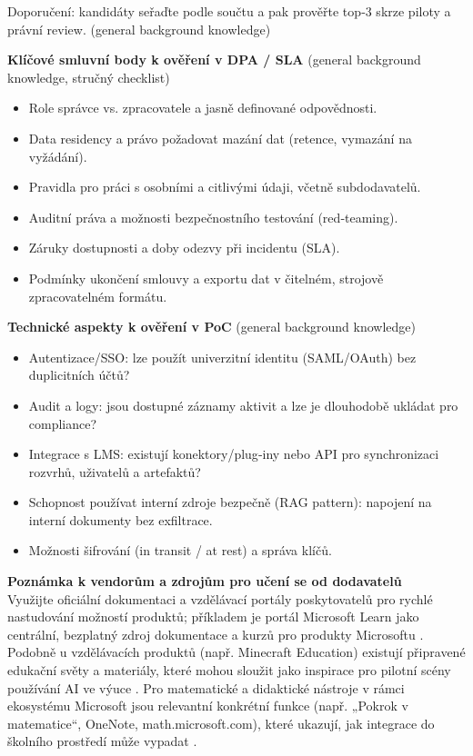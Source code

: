 \documentclass{report}%
\begin{document}
\noindent Doporučení: kandidáty seřaďte podle součtu a pak prověřte top‑3 skrze piloty a právní review. (general background knowledge)

\bigskip

\textbf{Klíčové smluvní body k ověření v DPA / SLA} (general background knowledge, stručný checklist)
\begin{itemize}
  \item Role správce vs. zpracovatele a jasně definované odpovědnosti.
  \item Data residency a právo požadovat mazání dat (retence, vymazání na vyžádání).
  \item Pravidla pro práci s osobními a citlivými údaji, včetně subdodavatelů.
  \item Auditní práva a možnosti bezpečnostního testování (red‑teaming).
  \item Záruky dostupnosti a doby odezvy při incidentu (SLA).
  \item Podmínky ukončení smlouvy a exportu dat v čitelném, strojově zpracovatelném formátu.
\end{itemize}

\bigskip

\textbf{Technické aspekty k ověření v PoC} (general background knowledge)
\begin{itemize}
  \item Autentizace/SSO: lze použít univerzitní identitu (SAML/OAuth) bez duplicitních účtů?
  \item Audit a logy: jsou dostupné záznamy aktivit a lze je dlouhodobě ukládat pro compliance?
  \item Integrace s LMS: existují konektory/plug‑iny nebo API pro synchronizaci rozvrhů, uživatelů a artefaktů?
  \item Schopnost používat interní zdroje bezpečně (RAG pattern): napojení na interní dokumenty bez exfiltrace.
  \item Možnosti šifrování (in transit / at rest) a správa klíčů.
\end{itemize}

\bigskip

\textbf{Poznámka k vendorům a zdrojům pro učení se od dodavatelů} \\
Využijte oficiální dokumentaci a vzdělávací portály poskytovatelů pro rychlé nastudování možností produktů; příkladem je portál Microsoft Learn jako centrální, bezplatný zdroj dokumentace a kurzů pro produkty Microsoftu \cite{kb_ai_101_tipu_pdf_04e4a115_page_54_1}. Podobně u vzdělávacích produktů (např. Minecraft Education) existují připravené edukační světy a materiály, které mohou sloužit jako inspirace pro pilotní scény používání AI ve výuce \cite{kb_ai_101_tipu_pdf_04e4a115_page_15_2}. Pro matematické a didaktické nástroje v rámci ekosystému Microsoft jsou relevantní konkrétní funkce (např. „Pokrok v matematice“, OneNote, math.microsoft.com), které ukazují, jak integrace do školního prostředí může vypadat \cite{kb_ai_101_tipu_pdf_04e4a115_page_8_1}.
\end{document}
